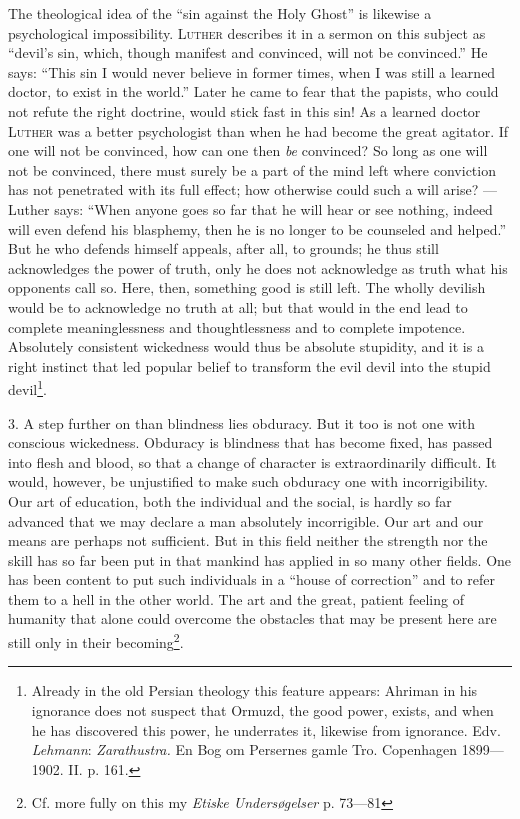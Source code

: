 \documentclass[12pt,a4paper,openany]{book}
\newcommand{\opage}[1]{\marginnote{\footnotesize\textit{[#1]}}}
\begin{document}
The theological idea of the ``sin against the Holy Ghost'' is likewise a psychological impossibility.
\textsc{Luther} describes it in a sermon on this subject as ``devil's sin, which, though manifest and
convinced, will not be convinced.'' He says: ``This sin I would never believe in former times, when I was
still a learned doctor, to exist in the world.'' Later he came to fear that the papists, who could not
refute the right doctrine, would stick fast in this sin! As a learned doctor \textsc{Luther} was a better
psychologist than when he had become the great agitator. If one will not be convinced, how can one then
\textit{be} convinced? So long as one will not be convinced, there must surely be a part of the mind left
where conviction has not penetrated with its full effect; how otherwise could such a will arise? ---
Luther says: ``When anyone goes so far that he will hear or see nothing, indeed will even defend his
blasphemy, then he is no longer to be counseled and helped.'' But he who defends himself appeals, after
all, to grounds; he thus still acknowledges the power of truth, only he does not acknowledge as truth what
his opponents call so. Here, then, something good is still left. The wholly devilish would be to
acknowledge no truth at all; but that would in the end lead to complete meaninglessness and
thoughtlessness and to complete impotence. Absolutely consistent wickedness would thus be absolute
stupidity, and it is a right instinct that led popular belief to transform the evil devil into the stupid
devil\footnote[1]{Already in the old Persian theology this feature appears: Ahriman in his ignorance does
not suspect that Ormuzd, the good power, exists, and when he has discovered this power, he underrates it,
likewise from ignorance. Edv. \emph{Lehmann}: \textit{Zarathustra.} En Bog om Persernes gamle Tro.
Copenhagen 1899---1902. II. p. 161.}.

3. A step further on than blindness lies
\opage{135}obduracy. But it too is not one with conscious wickedness. Obduracy is blindness that has become
fixed, has passed into flesh and blood, so that a change of character is extraordinarily difficult. It
would, however, be unjustified to make such obduracy one with incorrigibility. Our art of education, both
the individual and the social, is hardly so far advanced that we may declare a man absolutely
incorrigible. Our art and our means are perhaps not sufficient. But in this field neither the strength nor
the skill has so far been put in that mankind has applied in so many other fields. One has been content to
put such individuals in a ``house of correction'' and to refer them to a hell in the other world. The art
and the great, patient feeling of humanity that alone could overcome the obstacles that may be present here
are still only in their becoming\footnote[1]{Cf. more fully on this my \textit{Etiske Undersøgelser} p.
73---81}.
\end{document}
